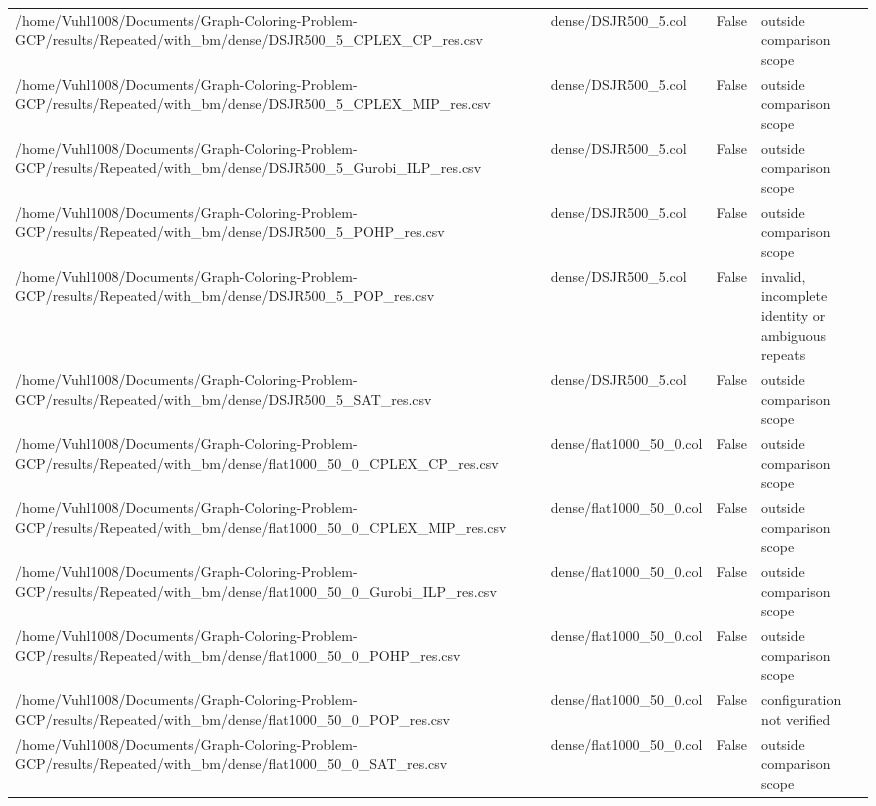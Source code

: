 \begin{table}[htbp]
\begin{tabular}{llll}
/home/Vuhl1008/Documents/Graph-Coloring-Problem-GCP/results/Repeated/with\_bm/dense/DSJR500\_5\_CPLEX\_CP\_res.csv & dense/DSJR500\_5.col & False & outside comparison scope \\
/home/Vuhl1008/Documents/Graph-Coloring-Problem-GCP/results/Repeated/with\_bm/dense/DSJR500\_5\_CPLEX\_MIP\_res.csv & dense/DSJR500\_5.col & False & outside comparison scope \\
/home/Vuhl1008/Documents/Graph-Coloring-Problem-GCP/results/Repeated/with\_bm/dense/DSJR500\_5\_Gurobi\_ILP\_res.csv & dense/DSJR500\_5.col & False & outside comparison scope \\
/home/Vuhl1008/Documents/Graph-Coloring-Problem-GCP/results/Repeated/with\_bm/dense/DSJR500\_5\_POHP\_res.csv & dense/DSJR500\_5.col & False & outside comparison scope \\
/home/Vuhl1008/Documents/Graph-Coloring-Problem-GCP/results/Repeated/with\_bm/dense/DSJR500\_5\_POP\_res.csv & dense/DSJR500\_5.col & False & invalid, incomplete identity or ambiguous repeats \\
/home/Vuhl1008/Documents/Graph-Coloring-Problem-GCP/results/Repeated/with\_bm/dense/DSJR500\_5\_SAT\_res.csv & dense/DSJR500\_5.col & False & outside comparison scope \\
/home/Vuhl1008/Documents/Graph-Coloring-Problem-GCP/results/Repeated/with\_bm/dense/flat1000\_50\_0\_CPLEX\_CP\_res.csv & dense/flat1000\_50\_0.col & False & outside comparison scope \\
/home/Vuhl1008/Documents/Graph-Coloring-Problem-GCP/results/Repeated/with\_bm/dense/flat1000\_50\_0\_CPLEX\_MIP\_res.csv & dense/flat1000\_50\_0.col & False & outside comparison scope \\
/home/Vuhl1008/Documents/Graph-Coloring-Problem-GCP/results/Repeated/with\_bm/dense/flat1000\_50\_0\_Gurobi\_ILP\_res.csv & dense/flat1000\_50\_0.col & False & outside comparison scope \\
/home/Vuhl1008/Documents/Graph-Coloring-Problem-GCP/results/Repeated/with\_bm/dense/flat1000\_50\_0\_POHP\_res.csv & dense/flat1000\_50\_0.col & False & outside comparison scope \\
/home/Vuhl1008/Documents/Graph-Coloring-Problem-GCP/results/Repeated/with\_bm/dense/flat1000\_50\_0\_POP\_res.csv & dense/flat1000\_50\_0.col & False & configuration not verified \\
/home/Vuhl1008/Documents/Graph-Coloring-Problem-GCP/results/Repeated/with\_bm/dense/flat1000\_50\_0\_SAT\_res.csv & dense/flat1000\_50\_0.col & False & outside comparison scope \\

\end{tabular}
\end{table}
